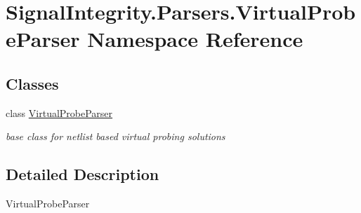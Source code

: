 \hypertarget{namespaceSignalIntegrity_1_1Parsers_1_1VirtualProbeParser}{}\section{Signal\+Integrity.\+Parsers.\+Virtual\+Probe\+Parser Namespace Reference}
\label{namespaceSignalIntegrity_1_1Parsers_1_1VirtualProbeParser}
\subsection*{Classes}
\begin{DoxyCompactItemize}
\item 
class \hyperlink{classSignalIntegrity_1_1Parsers_1_1VirtualProbeParser_1_1VirtualProbeParser}{Virtual\+Probe\+Parser}
\begin{DoxyCompactList}\small\item\em base class for netlist based virtual probing solutions \end{DoxyCompactList}\end{DoxyCompactItemize}


\subsection{Detailed Description}
\begin{DoxyVerb}VirtualProbeParser\end{DoxyVerb}
 